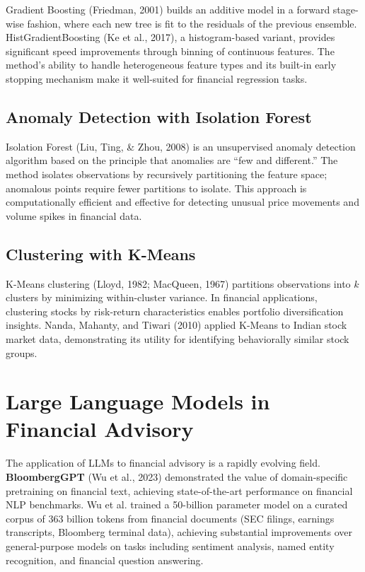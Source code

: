 \documentclass[12pt, a4paper, oneside]{report}
\begin{document}
Gradient Boosting (Friedman, 2001) builds an additive model in a forward stage-wise fashion, where each new tree is fit to the residuals of the previous ensemble. HistGradientBoosting (Ke et al., 2017), a histogram-based variant, provides significant speed improvements through binning of continuous features. The method's ability to handle heterogeneous feature types and its built-in early stopping mechanism make it well-suited for financial regression tasks.

\subsection{Anomaly Detection with Isolation Forest}

Isolation Forest (Liu, Ting, \& Zhou, 2008) is an unsupervised anomaly detection algorithm based on the principle that anomalies are ``few and different.'' The method isolates observations by recursively partitioning the feature space; anomalous points require fewer partitions to isolate. This approach is computationally efficient and effective for detecting unusual price movements and volume spikes in financial data.

\subsection{Clustering with K-Means}

K-Means clustering (Lloyd, 1982; MacQueen, 1967) partitions observations into $k$ clusters by minimizing within-cluster variance. In financial applications, clustering stocks by risk-return characteristics enables portfolio diversification insights. Nanda, Mahanty, and Tiwari (2010) applied K-Means to Indian stock market data, demonstrating its utility for identifying behaviorally similar stock groups.

\section{Large Language Models in Financial Advisory}
\label{sec:lit_llm}

The application of LLMs to financial advisory is a rapidly evolving field. \textbf{BloombergGPT} (Wu et al., 2023) demonstrated the value of domain-specific pretraining on financial text, achieving state-of-the-art performance on financial NLP benchmarks. Wu et al. trained a 50-billion parameter model on a curated corpus of 363 billion tokens from financial documents (SEC filings, earnings transcripts, Bloomberg terminal data), achieving substantial improvements over general-purpose models on tasks including sentiment analysis, named entity recognition, and financial question answering.
\end{document}

